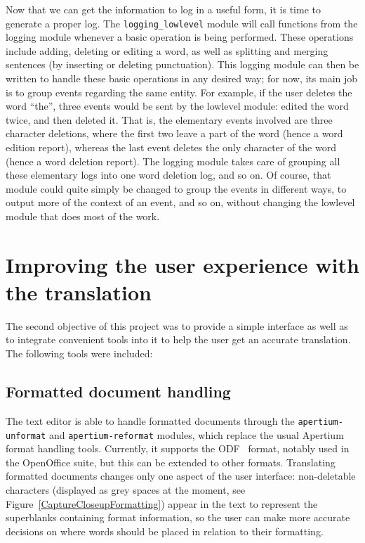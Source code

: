\documentclass[11pt]{article}
\begin{document}
Now that we can get the information to log in a useful form, it is time 
to generate a proper log. 
The {\tt\small logging\_lowlevel} module will call functions from the logging module 
whenever a basic operation is being performed. 
These operations include adding, deleting or editing a word, as well as 
splitting and merging sentences (by inserting or deleting punctuation).
This logging module can then be written to handle these basic operations 
in any desired way; for now, its main job is to group events regarding 
the same entity.
For example, if the user deletes the word ``the'', three events would be 
sent by the lowlevel module: edited the word twice, and then deleted it. 
That is, the elementary events involved are three character deletions, 
where the first two leave a part of the word (hence a word edition report), 
whereas the last event deletes the only character of the word (hence a 
word deletion report). 
The logging module takes care of grouping all these elementary logs into 
one word deletion log, and so on.
Of course, that module could quite simply be changed to group the events 
in different ways, to output more of the context of an event, and so on, 
without changing the lowlevel module that does most of the work.


\section{Improving the user experience with the translation}

The second objective of this project was to provide a simple interface as 
well as to integrate convenient tools into it to help the user get an 
accurate translation.
The following tools were included:

\subsection{Formatted document handling}

The text editor is able to handle formatted documents through the 
{\tt\small apertium-unformat} and {\tt\small apertium-reformat} modules,
which replace the usual Apertium format handling tools.
Currently, it supports the ODF~\citep{odf06} format, notably used in the 
OpenOffice suite, but this can be extended to other formats.
Translating formatted documents changes only one aspect of the user 
interface: non-deletable characters (displayed as grey spaces at 
the moment, see Figure~\ref{CaptureCloseupFormatting}) appear in the 
text to represent the superblanks containing format information, so 
the user can make more accurate decisions on where words should be
placed in relation to their formatting.
\end{document}
